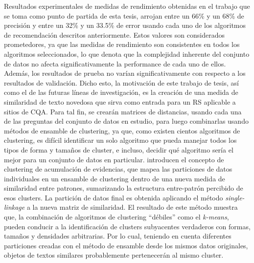 \bigskip Resultados experimentales de medidas de rendimiento obtenidas en el trabajo que se toma como punto de partida de esta tesis, arrojan entre un 66\% y un 68\% de precisión y entre un 32\% y un 33.5\% de error usando cada uno de los algoritmos de recomendación descritos anteriormente. Estos valores son considerados prometedores, ya que las medidas de rendimiento son consistentes en todos los algoritmos seleccionados, lo que denota que la complejidad inherente del conjunto de datos no afecta significativamente la performance de cada uno de ellos. Además, los resultados de prueba no varían significativamente con respecto a los resultados de validación. Dicho esto, la motivación de este trabajo de tesis, así como el de las futuras líneas de investigación, es la creación de una medida de similaridad de texto novedosa que sirva como entrada para un RS aplicable a sitios de CQA. Para tal fin, se crearán matrices de distancias, usando cada una de las preguntas del conjunto de datos en estudio, para luego combinarlas usando métodos de ensamble de clustering, ya que, como existen cientos algoritmos de clustering, es difícil identificar un solo algoritmo que pueda manejar todos los tipos de forma y tamaños de cluster, e incluso, decidir qué algoritmo sería el mejor para un conjunto de datos en particular. \cite{fred2005combining} introducen el concepto de clustering de acumulación de evidencias, que mapea las particiones de datos individuales en un ensamble de clustering dentro de una nueva medida de similaridad entre patrones, sumarizando la estructura entre-patrón percibido de esos clusters. La partición de datos final es obtenida aplicando el método \textit{single-linkage} a la nueva matriz de similaridad. El resultado de este método muestra que, la combinación de algoritmos de clustering “débiles” como el \textit{k-means}, pueden conducir a la identificación de clusters subyacentes verdaderos con formas, tamaños y densidades arbitrarias. Por lo cual, teniendo en cuenta diferentes particiones creadas con el método de ensamble desde los mismos datos originales, objetos de textos similares probablemente pertenecerán al mismo cluster.

